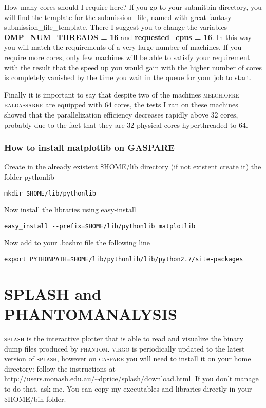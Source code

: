 \documentclass[10pt,a4paper,twoside]{article} %
\begin{document}
How many cores should I require here? 
If you go to your submitbin directory, you will find the template for the submission\_file, named with great fantasy submission\_file\_template. There I suggest you to change the variables \textbf{OMP\_NUM\_THREADS = 16} and \textbf{requested\_cpus = 16}. In this way you will match the requirements of a very large number of machines. If you require more cores, only few machines will be able to satisfy your requirement with the result that the speed up you would gain with the higher number of cores is completely vanished by the time you wait in the queue for your job to start.

Finally it is important to say that despite two of the machines \textsc{melchiorre} \textsc{baldassarre} are equipped with 64 cores, the tests I ran on these machines showed that the parallelization efficiency decreases rapidly above 32 cores, probably due to the fact that they are 32 physical cores hyperthreaded to 64. 

\subsubsection{How to install matplotlib on GASPARE}\label{viscosity}

Create in the already existent \$HOME/lib directory (if not existent create it) the folder pythonlib
\begin{verbatim}
mkdir $HOME/lib/pythonlib
\end{verbatim}
Now install the libraries using easy-install
\begin{verbatim}
easy_install --prefix=$HOME/lib/pythonlib matplotlib
\end{verbatim}
Now add to your .bashrc file the following line
\begin{verbatim}
export PYTHONPATH=$HOME/lib/pythonlib/lib/python2.7/site-packages
\end{verbatim}

\section{SPLASH and PHANTOMANALYSIS}\label{phansplash}

\textsc{splash} is the interactive plotter that is able to read and visualize the binary dump files produced by \textsc{phantom}. 
\textsc{virgo} is periodically updated to the latest version of \textsc{splash}, however on \textsc{gaspare} you will need to install it on your home directory: follow the instructions at \url{http://users.monash.edu.au/~dprice/splash/download.html}. If you don't manage to do that, ask me. You can copy my executables and libraries directly in your \$HOME/bin folder.
\end{document}
